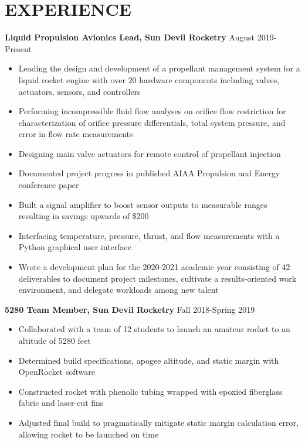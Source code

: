 \documentclass{article}
\begin{document}
\section{EXPERIENCE}
\textbf{Liquid Propulsion Avionics Lead, Sun Devil Rocketry}
\hfill
\vspace{0.5em}
August 2019-Present
\begin{itemize}
	\item{Leading the design and development of a propellant management system for a liquid rocket engine with over 20 hardware components including valves, actuators, sensors, and controllers}
	\item{Performing incompressible fluid flow analyses on orifice flow restriction for characterization of orifice pressure differentials, total system pressure, and error in flow rate measurements}
	\item{Designing main valve actuators for remote control of propellant injection}
	\item{Documented project progress in published AIAA Propulsion and Energy conference paper}
	\item{Built a signal amplifier to boost sensor outputs to measurable ranges resulting in savings upwards of \$200}
	\item{Interfacing temperature, pressure, thrust, and flow measurements with a Python graphical user interface}
	\item{Wrote a development plan for the 2020-2021 academic year consisting of 42 deliverables to document project milestones, cultivate a results-oriented work environment, and delegate workloads among new talent}
\end{itemize}
\vspace{1em}
\textbf{5280 Team Member, Sun Devil Rocketry}
\hfill Fall 2018-Spring 2019
\vspace{0.5em}
\begin{itemize}
	\item Collaborated with a team of 12 students to launch an amateur rocket to an altitude of 5280 feet
	\item Determined build specifications, apogee altitude, and static margin with OpenRocket software
	\item Constructed rocket with phenolic tubing wrapped with epoxied fiberglass fabric and laser-cut fins 
	\item Adjusted final build to pragmatically mitigate static margin calculation error, allowing rocket to be launched on time
\end{itemize}
\end{document}
